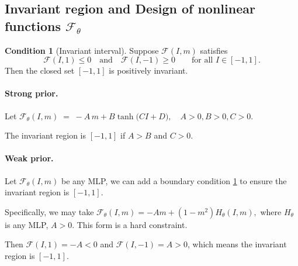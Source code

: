 \documentclass[11pt,a4paper]{article}
\theoremstyle{plain}
\newtheorem{proposition}[theorem]{Proposition}
\theoremstyle{definition}
\newtheorem{condition}[theorem]{Condition}
\theoremstyle{remark}
\begin{document}
\subsection{Invariant region and Design of nonlinear functions $\mathcal{F}_\theta$}
\label{subsec:designs_lipschitz}


\begin{condition}[Invariant interval]\label{cond:invariant}
	Suppose $\mathcal{F}(I,m)$ satisfies
	\[
		\mathcal{F}(I,1)\le 0
		\quad\text{and}\quad
		\mathcal{F}(I,-1)\ge 0
		\qquad\text{for all } I\in[-1,1].
	\]
	Then the closed set $[-1,1]$ is positively invariant.
\end{condition}





\paragraph{Strong prior.} Let $ \mathcal{F}_\theta(I,m) \;=\; -A\,m + B \tanh\big( CI + D \big),\quad A>0, B>0, C>0.$

The invariant region is $[-1,1]$ if $A > B$ and $C > 0$.



\paragraph{Weak prior.} Let $ \mathcal{F}_\theta(I,m)$ be any MLP, we can add a boundary condition \ref{cond:invariant} to ensure the invariant region is $[-1,1]$.

Specifically, we may take $\mathcal{F}_\theta(I,m) = -Am + (1 - m^2) H_\theta(I,m),$ where $H_\theta$ is any MLP, $A>0$. This form is a hard constraint.

Then $\mathcal{F}(I, 1) = -A < 0$ and $\mathcal{F}(I, -1) = A > 0$, which means the invariant region is $[-1,1]$.

\end{document}

